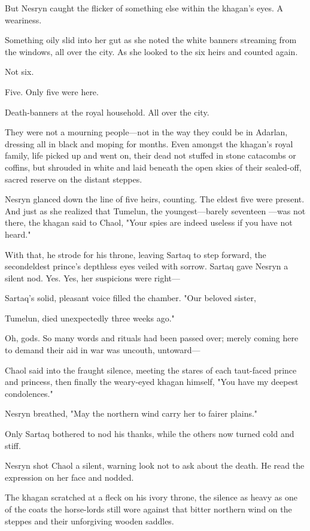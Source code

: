 But Nesryn caught the flicker of something else within the khagan's eyes.
A weariness.

Something oily slid into her gut as she noted the white banners streaming from the windows, all over the city.
As she looked to the six heirs and counted again.

Not six.

Five.
Only five were here.

Death-banners at the royal household.
All over the city.

They were not a mourning people---not in the way they could be in Adarlan, dressing all in black and moping for months.
Even amongst the khagan's royal family, life picked up and went on, their dead not stuffed in stone catacombs or coffins, but shrouded in white and laid beneath the open skies of their sealed-off, sacred reserve on the distant steppes.

Nesryn glanced down the line of five heirs, counting.
The eldest five were present.
And just as she realized that Tumelun, the youngest---barely seventeen ---was not there, the khagan said to Chaol, "Your spies are indeed useless if you have not heard."

With that, he strode for his throne, leaving Sartaq to step forward, the secondeldest prince's depthless eyes veiled with sorrow.
Sartaq gave Nesryn a silent nod.
Yes.
Yes, her suspicions were right---

Sartaq's solid, pleasant voice filled the chamber.
"Our beloved sister,

Tumelun, died unexpectedly three weeks ago."

Oh, gods.
So many words and rituals had been passed over; merely coming here to demand their aid in war was uncouth, untoward---

Chaol said into the fraught silence, meeting the stares of each taut-faced prince and princess, then finally the weary-eyed khagan himself, "You have my deepest condolences."

Nesryn breathed, "May the northern wind carry her to fairer plains."

Only Sartaq bothered to nod his thanks, while the others now turned cold and stiff.

Nesryn shot Chaol a silent, warning look not to ask about the death.
He read the expression on her face and nodded.

The khagan scratched at a fleck on his ivory throne, the silence as heavy as one of the coats the horse-lords still wore against that bitter northern wind on the steppes and their unforgiving wooden saddles.

